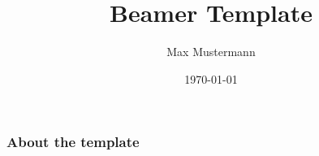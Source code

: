 \documentclass[
compress,
xcolor=table,
dvipsnames,
]{beamer}
\title[\arabic{page} ]{Beamer Template}
\author[Max]{Max Mustermann}
\institute[Inst.]{Institute/Affiliation}
\date[]{\today}
\begin{document}
\begin{frame}[plain]
  \titlepage
\end{frame}




\begin{frame}
  \frametitle{About the template}
  

  
\end{frame}

\begin{frame}
\frametitle{}

\insertBib

\end{frame}
\end{document}
